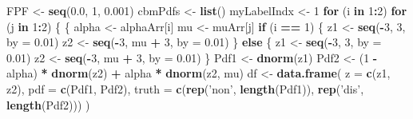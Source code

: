 \documentclass[
]{book}
\newenvironment{Shaded}{\begin{snugshade}}{\end{snugshade}}
\newcommand{\ControlFlowTok}[1]{\textcolor[rgb]{0.13,0.29,0.53}{\textbf{#1}}}
\newcommand{\DataTypeTok}[1]{\textcolor[rgb]{0.13,0.29,0.53}{#1}}
\newcommand{\DecValTok}[1]{\textcolor[rgb]{0.00,0.00,0.81}{#1}}
\newcommand{\FloatTok}[1]{\textcolor[rgb]{0.00,0.00,0.81}{#1}}
\newcommand{\KeywordTok}[1]{\textcolor[rgb]{0.13,0.29,0.53}{\textbf{#1}}}
\newcommand{\NormalTok}[1]{#1}
\newcommand{\OperatorTok}[1]{\textcolor[rgb]{0.81,0.36,0.00}{\textbf{#1}}}
\newcommand{\StringTok}[1]{\textcolor[rgb]{0.31,0.60,0.02}{#1}}
\begin{document}
\begin{Shaded}
\begin{Highlighting}[]
\NormalTok{FPF <-}\StringTok{ }\KeywordTok{seq}\NormalTok{(}\FloatTok{0.0}\NormalTok{, }\DecValTok{1}\NormalTok{, }\FloatTok{0.001}\NormalTok{)}
\NormalTok{cbmPdfs <-}\StringTok{ }\KeywordTok{list}\NormalTok{()}
\NormalTok{myLabelIndx <-}\StringTok{ }\DecValTok{1}
\ControlFlowTok{for}\NormalTok{ (i }\ControlFlowTok{in} \DecValTok{1}\OperatorTok{:}\DecValTok{2}\NormalTok{)}
  \ControlFlowTok{for}\NormalTok{ (j }\ControlFlowTok{in} \DecValTok{1}\OperatorTok{:}\DecValTok{2}\NormalTok{) }
\NormalTok{  \{}
\NormalTok{    \{}
\NormalTok{      alpha <-}\StringTok{ }\NormalTok{alphaArr[i]}
\NormalTok{      mu <-}\StringTok{ }\NormalTok{muArr[j]}
      \ControlFlowTok{if}\NormalTok{ (i }\OperatorTok{==}\StringTok{ }\DecValTok{1}\NormalTok{) \{}
\NormalTok{        z1 <-}\StringTok{ }\KeywordTok{seq}\NormalTok{(}\OperatorTok{-}\DecValTok{3}\NormalTok{, }\DecValTok{3}\NormalTok{, }\DataTypeTok{by =} \FloatTok{0.01}\NormalTok{)}
\NormalTok{        z2 <-}\StringTok{ }\KeywordTok{seq}\NormalTok{(}\OperatorTok{-}\DecValTok{3}\NormalTok{, mu }\OperatorTok{+}\StringTok{ }\DecValTok{3}\NormalTok{, }\DataTypeTok{by =} \FloatTok{0.01}\NormalTok{)}
\NormalTok{      \} }\ControlFlowTok{else}\NormalTok{ \{}
\NormalTok{        z1 <-}\StringTok{ }\KeywordTok{seq}\NormalTok{(}\OperatorTok{-}\DecValTok{3}\NormalTok{, }\DecValTok{3}\NormalTok{, }\DataTypeTok{by =} \FloatTok{0.01}\NormalTok{)}
\NormalTok{        z2 <-}\StringTok{ }\KeywordTok{seq}\NormalTok{(}\OperatorTok{-}\DecValTok{3}\NormalTok{, mu }\OperatorTok{+}\StringTok{ }\DecValTok{3}\NormalTok{, }\DataTypeTok{by =} \FloatTok{0.01}\NormalTok{)}
\NormalTok{      \}}
\NormalTok{      Pdf1 <-}\StringTok{ }\KeywordTok{dnorm}\NormalTok{(z1)}
\NormalTok{      Pdf2 <-}\StringTok{ }\NormalTok{(}\DecValTok{1} \OperatorTok{-}\StringTok{ }\NormalTok{alpha) }\OperatorTok{*}\StringTok{ }\KeywordTok{dnorm}\NormalTok{(z2) }\OperatorTok{+}\StringTok{ }\NormalTok{alpha }\OperatorTok{*}\StringTok{ }\KeywordTok{dnorm}\NormalTok{(z2, mu)}
\NormalTok{      df <-}\StringTok{ }\KeywordTok{data.frame}\NormalTok{(}
        \DataTypeTok{z =} \KeywordTok{c}\NormalTok{(z1, z2), }\DataTypeTok{pdf =} \KeywordTok{c}\NormalTok{(Pdf1, Pdf2), }
        \DataTypeTok{truth =} \KeywordTok{c}\NormalTok{(}\KeywordTok{rep}\NormalTok{(}\StringTok{'non'}\NormalTok{, }\KeywordTok{length}\NormalTok{(Pdf1)), }
                  \KeywordTok{rep}\NormalTok{(}\StringTok{'dis'}\NormalTok{, }\KeywordTok{length}\NormalTok{(Pdf2)))}
\NormalTok{      )}
      

\end{Highlighting}
\end{Shaded}
\end{document}
